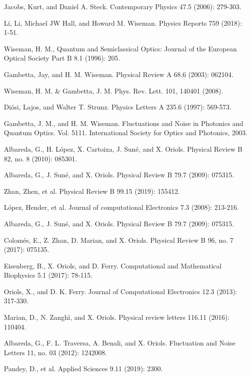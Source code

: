 \documentclass[11pt, a4paper]{article} %
\begin{document}
\begin{thebibliography}{1}
{
Jacobs, Kurt, and Daniel A. Steck. Contemporary Physics 47.5 (2006): 279-303.

Li, Li, Michael JW Hall, and Howard M. Wiseman. Physics Reports 759 (2018): 1-51.

Wiseman, H. M., Quantum and Semiclassical Optics: Journal of the European Optical Society Part B 8.1 (1996): 205.

Gambetta, Jay, and H. M. Wiseman. Physical Review A 68.6 (2003): 062104.

Wiseman, H. M. \& Gambetta, J. M. Phys. Rev. Lett. 101, 140401 (2008).

Diósi, Lajos, and Walter T. Strunz. Physics Letters A 235.6 (1997): 569-573.

Gambetta, J. M., and H. M. Wiseman. Fluctuations and Noise in Photonics and Quantum Optics. Vol. 5111. International Society for Optics and Photonics, 2003.

Albareda, G., H. López, X. Cartoixa, J. Suné, and X. Oriols. Physical Review B 82, no. 8 (2010): 085301.

Albareda, G., J. Suné, and X. Oriols. Physical Review B 79.7 (2009): 075315.

Zhan, Zhen, et al. Physical Review B 99.15 (2019): 155412.

López, Hender, et al. Journal of computational Electronics 7.3 (2008): 213-216.

Albareda, G., J. Suné, and X. Oriols. Physical Review B 79.7 (2009): 075315.

Colomés, E., Z. Zhan, D. Marian, and X. Oriols. Physical Review B 96, no. 7 (2017): 075135.

Eisenberg, B., X. Oriols, and D. Ferry. Computational and Mathematical Biophysics 5.1 (2017): 78-115.

Oriols, X., and D. K. Ferry. Journal of Computational Electronics 12.3 (2013): 317-330.

Marian, D., N. Zanghì, and X. Oriols. Physical review letters 116.11 (2016): 110404.

Albareda, G., F. L. Traversa, A. Benali, and X. Oriols. Fluctuation and Noise Letters 11, no. 03 (2012): 1242008.

Pandey, D., et al. Applied Sciences 9.11 (2019): 2300.

}
\end{thebibliography}
\end{document}

